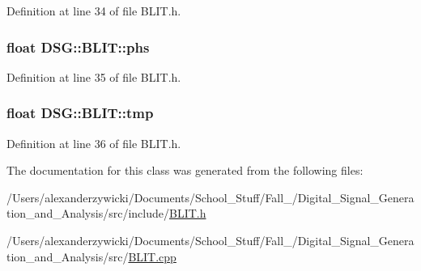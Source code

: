 Definition at line 34 of file B\+L\+I\+T.\+h.

\hypertarget{classDSG_1_1BLIT_a392dc88ed2691c6637a6afe8607881c6}{
\subsubsection[{phs}]{\setlength{\rightskip}{0pt plus 5cm}float D\+S\+G\+::\+B\+L\+I\+T\+::phs\hspace{0.3cm}{\ttfamily [protected]}}}\label{classDSG_1_1BLIT_a392dc88ed2691c6637a6afe8607881c6}


Definition at line 35 of file B\+L\+I\+T.\+h.

\hypertarget{classDSG_1_1BLIT_ac0570d5d963ca947e8860a547df7b9dc}{
\subsubsection[{tmp}]{\setlength{\rightskip}{0pt plus 5cm}float D\+S\+G\+::\+B\+L\+I\+T\+::tmp\hspace{0.3cm}{\ttfamily [protected]}}}\label{classDSG_1_1BLIT_ac0570d5d963ca947e8860a547df7b9dc}


Definition at line 36 of file B\+L\+I\+T.\+h.



The documentation for this class was generated from the following files\+:\begin{DoxyCompactItemize}
\item 
/\+Users/alexanderzywicki/\+Documents/\+School\+\_\+\+Stuff/\+Fall\+\_/\+Digital\+\_\+\+Signal\+\_\+\+Generation\+\_\+and\+\_\+\+Analysis/src/include/\hyperlink{BLIT_8h}{B\+L\+I\+T.\+h}\item 
/\+Users/alexanderzywicki/\+Documents/\+School\+\_\+\+Stuff/\+Fall\+\_/\+Digital\+\_\+\+Signal\+\_\+\+Generation\+\_\+and\+\_\+\+Analysis/src/\hyperlink{BLIT_8cpp}{B\+L\+I\+T.\+cpp}\end{DoxyCompactItemize}
